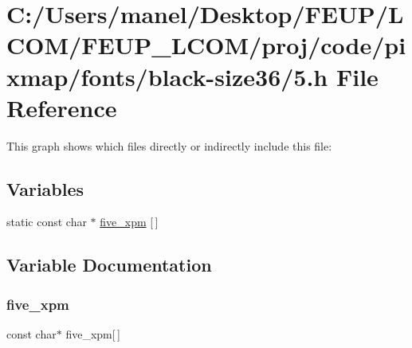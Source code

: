 \hypertarget{black-size36_25_8h}{}\section{C\+:/\+Users/manel/\+Desktop/\+F\+E\+U\+P/\+L\+C\+O\+M/\+F\+E\+U\+P\+\_\+\+L\+C\+O\+M/proj/code/pixmap/fonts/black-\/size36/5.h File Reference}
\label{black-size36_25_8h}
This graph shows which files directly or indirectly include this file\+:
\subsection*{Variables}
\begin{DoxyCompactItemize}
\item 
static const char $\ast$ \mbox{\hyperlink{black-size36_25_8h_a444ff668df099678f134b6718240c5e5}{five\+\_\+xpm}} \mbox{[}$\,$\mbox{]}
\end{DoxyCompactItemize}


\subsection{Variable Documentation}
\mbox{\label{black-size36_25_8h_a444ff668df099678f134b6718240c5e5}} 
\subsubsection{\texorpdfstring{five\_xpm}{five\_xpm}}
{\footnotesize\ttfamily const char$\ast$ five\+\_\+xpm\mbox{[}$\,$\mbox{]}\hspace{0.3cm}{\ttfamily [static]}}

